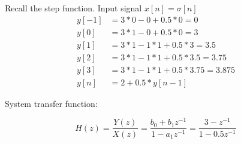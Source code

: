 \item Recall the step function. Input signal $x[n] = \sigma[n]$
\begin{align*}
y[-1] &= 3*0 - 0 + 0.5*0 = 0 \\
	y[0] &= 3*1 - 0 + 0.5*0 = 3 \\
	y[1] &= 3*1 - 1*1 + 0.5*3 = 3.5 \\
	y[2] &= 3*1 - 1*1 + 0.5*3.5 = 3.75 \\
	y[3] &= 3*1 - 1*1 + 0.5*3.75 =  3.875\\
	y[n] &= 2 + 0.5*y[n-1]
\end{align*}

\item System transfer function:

$$	H(z) = \frac{Y(z)}{X(z)} = \frac{b_0+b_1z^{-1}}{1-a_1z^{-1}} = \frac{3-z^{-1}}{1 - 0.5z^{-1}} $$